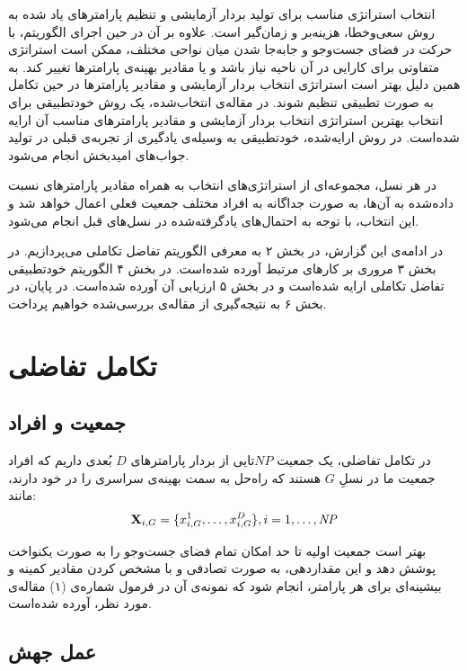 \documentclass[12pt,a4paper]{article}
\theoremstyle{definition}
\theoremstyle{theorem}
\theoremstyle{definition}
\begin{document}
انتخاب استراتژی مناسب برای تولید بردار آزمایشی و تنظیم پارامتر‌های یاد شده به روش سعی‌وخطا، هزینه‌بر و زمان‌گیر است. علاوه بر آن در حین اجرای الگوریتم، با حرکت در فضای جست‌وجو و جابه‌جا شدن میان نواحی مختلف، ممکن است استراتژی متفاوتی برای کارایی در آن‌ ناحیه نیاز باشد و یا مقادیر بهینه‌ی پارامترها تغییر کند. به همین‌ دلیل بهتر است استراتژی انتخاب بردار آزمایشی و مقادیر پارامترها در حین تکامل به صورت تطبیقی تنظیم شوند. در مقاله‌ی انتخاب‌شده، یک روش خودتطبیقی برای انتخاب بهترین استراتژی انتخاب بردار آزمایشی و مقادیر پارامترهای مناسب آن ارایه شده‌است. در روش ارایه‌شده، خودتطبیقی به وسیله‌ی یادگیری از تجربه‌ی قبلی در تولید جواب‌های امیدبخش انجام می‌شود.

در هر نسل، مجموعه‌ای از استراتژی‌های انتخاب به همراه مقادیر پارامترهای نسبت‌‌ داده‌شده به آن‌ها، به صورت جداگانه به افراد مختلف جمعیت فعلی اعمال خواهد شد و این انتخاب، با توجه به احتمال‌های یادگرفته‌شده در نسل‌های قبل انجام می‌شود. 

در ادامه‌ی این گزارش، در بخش ۲ به معرفی الگوریتم تفاضل تکاملی می‌پردازیم. در بخش ۳ مروری بر کارهای مرتبط آورده‌ شده‌است. در بخش ۴ الگوریتم خودتطبیقی تفاضل تکاملی ارایه شده‌است و در بخش ۵ ارزیابی آن آورده شده‌است. در پایان، در بخش ۶ به نتیجه‌گیری از مقاله‌ی بررسی‌شده خواهیم پرداخت.


\newpage
\section{تکامل تفاضلی}
\subsection{جمعیت و افراد}
در تکامل تفاضلی، یک جمعیت
$\mathit{NP}$تایی
از بردار پارامترهای
$\mathit{D}$
بُعدی داریم که افراد جمعیت ما در نسلِ
$\mathit{G}$
هستند که راه‌حل به سمت بهینه‌ی سراسری را در خود دارند، مانند:‌
\begin{equation}
\label{de-individual}
{\bf{X}}_{i,G} =  \lbrace {x_{i,G}^{1} , \dots , x_{i,G}^{D} } \rbrace , i=1, \dots , \mathit{NP} 
\end{equation}

بهتر است جمعیت اولیه تا حد امکان تمام فضای جست‌وجو را به صورت یکنواخت پوشش دهد و این مقداردهی، به صورت تصادفی و با مشخص کردن مقادیر کمینه و بیشینه‌ای برای هر پارامتر، انجام شود که نمونه‌ی آن در فرمول شماره‌ی 
(۱)
مقاله‌ی مورد نظر\cite{Sade}، آورده‌ شده‌است.

\subsection{عمل جهش}
\end{document}
